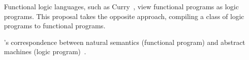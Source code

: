 Functional logic languages, such as Curry~\autocite{Hanus:Ganzinger13}, view functional programs as logic programs.
This proposal takes the opposite approach, compiling a class of logic programs to functional programs.

's correspondence between natural semantics (functional program) and abstract machines (logic program)~\autocite*{Simmons+Zerny:LICS13}.

